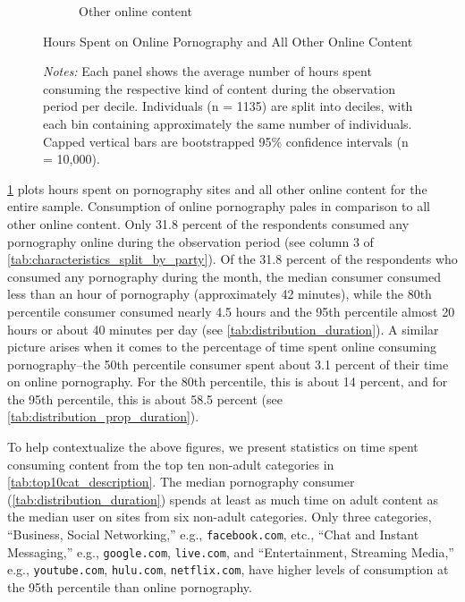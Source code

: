 \documentclass[12pt,twoside]{article}
\begin{document}
\begin{figure}[!ht]
\begin{subfigure}[b]{0.495\textwidth}
         \caption{Other online content}
     \end{subfigure}
\caption{Hours Spent on Online Pornography and All Other Online Content}
\label{fig:distribution_duration_on_adultsites_fullsample}
\caption*{\footnotesize \emph{Notes:} 
    Each panel shows the average number of hours spent consuming the respective kind of content during the observation period per decile.
    Individuals (n = 1135) are split into deciles, with each bin containing approximately the same number of individuals.
    Capped vertical bars are bootstrapped 95\% confidence intervals (n = 10,000).
}
\end{figure}

\cref{fig:distribution_duration_on_adultsites_fullsample} plots hours spent on pornography sites and all other online content for the entire sample. Consumption of online pornography pales in comparison to all other online content. Only 31.8 percent of the respondents consumed any pornography online during the observation period (see column 3 of \cref{tab:characteristics_split_by_party}). Of the 31.8 percent of the respondents who consumed any pornography during the month, the median consumer consumed less than an hour of pornography (approximately 42 minutes), while the 80th percentile consumer consumed nearly 4.5 hours and the 95th percentile almost 20 hours or about 40 minutes per day (see \cref{tab:distribution_duration}). A similar picture arises when it comes to the percentage of time spent online consuming pornography--the 50th percentile consumer spent about 3.1 percent of their time on online pornography. For the 80th percentile, this is about 14 percent, and for the 95th percentile, this is about 58.5 percent (see \cref{tab:distribution_prop_duration}).

To help contextualize the above figures, we present statistics on time spent consuming content from the top ten non-adult categories in \cref{tab:top10cat_description}. The median pornography consumer (\cref{tab:distribution_duration}) spends at least as much time on adult content as the median user on sites from six non-adult categories. Only three categories, ``Business, Social Networking,'' e.g., \texttt{facebook.com}, etc., ``Chat and Instant Messaging,'' e.g., \texttt{google.com}, \texttt{live.com}, and ``Entertainment, Streaming Media,'' e.g., \texttt{youtube.com}, \texttt{hulu.com}, \texttt{netflix.com}, have higher levels of consumption at the 95th percentile than online pornography.
\end{document}
